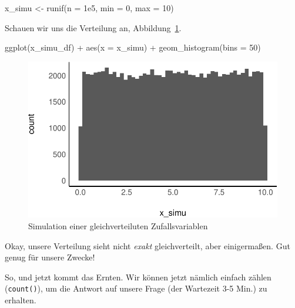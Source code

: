 \documentclass[
  a4paper,
  DIV=11]{scrreprt}
\newenvironment{Shaded}{\begin{snugshade}}{\end{snugshade}}
\newcommand{\AttributeTok}[1]{\textcolor[rgb]{0.40,0.45,0.13}{#1}}
\newcommand{\DecValTok}[1]{\textcolor[rgb]{0.68,0.00,0.00}{#1}}
\newcommand{\FloatTok}[1]{\textcolor[rgb]{0.68,0.00,0.00}{#1}}
\newcommand{\FunctionTok}[1]{\textcolor[rgb]{0.28,0.35,0.67}{#1}}
\newcommand{\NormalTok}[1]{\textcolor[rgb]{0.00,0.23,0.31}{#1}}
\newcommand{\OtherTok}[1]{\textcolor[rgb]{0.00,0.23,0.31}{#1}}
\newcommand{\SpecialCharTok}[1]{\textcolor[rgb]{0.37,0.37,0.37}{#1}}
\theoremstyle{definition}
\theoremstyle{remark}
\begin{document}
\begin{Shaded}
\begin{Highlighting}[]
\NormalTok{x\_simu }\OtherTok{\textless{}{-}} \FunctionTok{runif}\NormalTok{(}\AttributeTok{n =} \FloatTok{1e5}\NormalTok{, }\AttributeTok{min =} \DecValTok{0}\NormalTok{, }\AttributeTok{max =} \DecValTok{10}\NormalTok{)}
\end{Highlighting}
\end{Shaded}

Schauen wir uns die Verteilung an, Abbildung~\ref{fig-simu-gleichvert}.

\begin{Shaded}
\begin{Highlighting}[]
\FunctionTok{ggplot}\NormalTok{(x\_simu\_df) }\SpecialCharTok{+}
  \FunctionTok{aes}\NormalTok{(}\AttributeTok{x =}\NormalTok{ x\_simu) }\SpecialCharTok{+}
  \FunctionTok{geom\_histogram}\NormalTok{(}\AttributeTok{bins =} \DecValTok{50}\NormalTok{)}
\end{Highlighting}
\end{Shaded}

\begin{figure}[H]

{\centering \includegraphics{./Verteilungen_files/figure-pdf/fig-simu-gleichvert-1.pdf}

}

\caption{\label{fig-simu-gleichvert}Simulation einer gleichverteiluten
Zufallsvariablen}

\end{figure}

Okay, unsere Verteilung sieht nicht \emph{exakt} gleichverteilt, aber
einigermaßen. Gut genug für unsere Zwecke!

So, und jetzt kommt das Ernten. Wir können jetzt nämlich einfach zählen
(\texttt{count()}), um die Antwort auf unsere Frage (der Wartezeit 3-5
Min.) zu erhalten.
\end{document}
